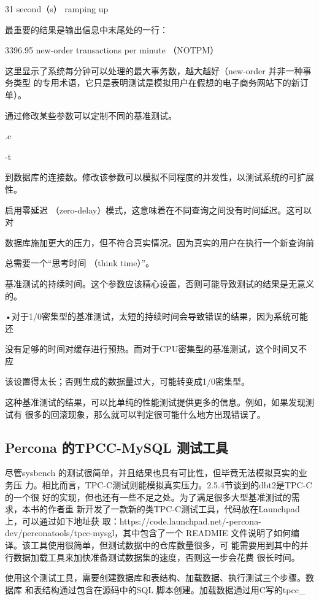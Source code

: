 31 second（s） ramping up

最重要的结果是输出信息中末尾处的一行：

3396.95 new-order transactions per minute （NOTPM）

这里显示了系统每分钟可以处理的最大事务数，越大越好（new-order 并非一种事务类型
的专用术语，它只是表明测试是模拟用户在假想的电子商务网站下的新订单）。

通过修改某些参数可以定制不同的基准测试。

.c

-t

到数据库的连接数。修改该参数可以模拟不同程度的并发性，以测试系统的可扩展性。

启用零延迟 （zero-delay）模式，这意味着在不同查询之间没有时间延迟。这可以对

数据库施加更大的压力，但不符合真实情况。因为真实的用户在执行一个新查询前

总需要一个“思考时间 （think time）”。

基准测试的持续时间。这个参数应该精心设置，否则可能导致测试的结果是无意义的。

•对于1/0密集型的基准测试，太短的持续时间会导致错误的结果，因为系统可能还

没有足够的时间对缓存进行预热。而对于CPU密集型的基准测试，这个时间又不应

该设置得太长；否则生成的数据量过大，可能转变成1/0密集型。

这种基准测试的结果，可以比单纯的性能测试提供更多的信息。例如，如果发现测试有
很多的回滚现象，那么就可以判定很可能什么地方出现错误了。

\subsection{Percona 的TPCC-MySQL 测试工具}
尽管sysbench 的测试很简单，并且结果也具有可比性，但毕竟无法模拟真实的业务压
力。相比而言，TPC-C测试则能模拟真实压力。2.5.4节谈到的dbt2是TPC-C的一个很
好的实现，但也还有一些不足之处。为了满足很多大型基准测试的需求，本书的作者重
新开发了一款新的类TPC-C测试工具，代码放在Launchpad上，可以通过如下地址获
取：https://code.launchpad.net/-percona-dev/perconatools/tpcc-mysgl，其中包含了一个
READMIE 文件说明了如何编译。该工具使用很简单，但测试数据中的仓库数量很多，可
能需要用到其中的并行数据加载工具来加快准备测试数据集的速度，否则这一步会花费
很长时间。

使用这个测试工具，需要创建数据库和表结构、加载数据、执行测试三个步骤。数据库
和表结构通过包含在源码中的SQL 脚本创建。加载数据通过用C写的tpcc\_

